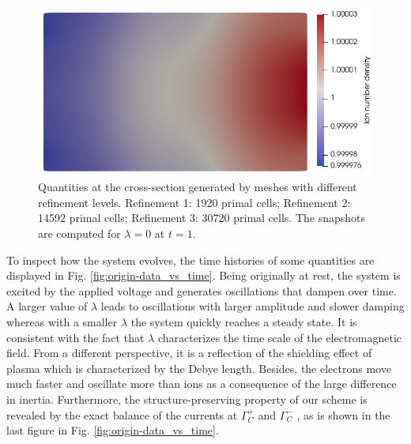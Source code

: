 \documentclass{article}
\begin{document}
\begin{figure}
    \includegraphics[scale=0.27]{slice_ni_T-1_lambda-0_32-3-4.png}
    \caption{Quantities at the cross-section generated by meshes with different refinement levels. Refinement 1: 1920 primal cells; Refinement 2: 14592 primal cells; Refinement 3: 30720 primal cells. The snapshots are computed for $\lambda = 0$ at $t = 1$.}
    \label{fig:grid_study_3d_clip_lambda-0}
\end{figure}

To inspect how the system evolves, the time histories of some quantities are displayed in Fig. \ref{fig:origin-data_vs_time}. Being originally at rest, the system is excited by the applied voltage and generates oscillations that dampen over time. A larger value of $\lambda$ leads to oscillations with larger amplitude and slower damping whereas with a smaller $\lambda$ the system quickly reaches a steady state. It is consistent with the fact that $\lambda$ characterizes the time scale of the electromagnetic field. From a different perspective, it is a reflection of the shielding effect of plasma which is characterized by the Debye length. Besides, the electrons move much faster and oscillate more than ions as a consequence of the large difference in inertia. Furthermore, the structure-preserving property of our scheme is revealed by the exact balance of the currents at $\Gamma^+_C$ and $\Gamma^-_C$ \cite{Hiptmair_2021}, as is shown in the last figure in Fig. \ref{fig:origin-data_vs_time}.
\end{document}
